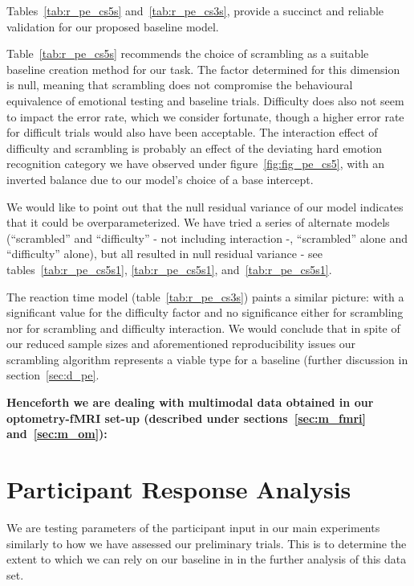 	    Tables~\ref{tab:r_pe_cs5s} and~\ref{tab:r_pe_cs3s}, provide a succinct and reliable validation for our proposed baseline model.
	    
	    Table~\ref{tab:r_pe_cs5s} recommends the choice of scrambling as a suitable baseline creation method for our task.
	    The factor determined for this dimension is null, meaning that scrambling does not compromise the behavioural equivalence of emotional testing and baseline trials.
	    Difficulty does also not seem to impact the error rate, which we consider fortunate, though a higher error rate for difficult trials would also have been acceptable.
	    The interaction effect of difficulty and scrambling is probably an effect of the deviating hard emotion recognition category we have observed under figure~\ref{fig:fig_pe_cs5}, with an inverted balance due to our model's choice of a base intercept.
	    
	    We would like to point out that the null residual variance of our model indicates that it could be overparameterized.
	    We have tried a series of alternate models (“scrambled” and “difficulty” - not including interaction -, “scrambled” alone and “difficulty” alone), but all resulted in null residual variance - 
	    see tables~\ref{tab:r_pe_cs5s1}, \ref{tab:r_pe_cs5s1}, and~\ref{tab:r_pe_cs5s1}.
	    
	    The reaction time model (table~\ref{tab:r_pe_cs3s}) paints a similar picture: with a significant value for the difficulty factor and no significance either for scrambling nor for scrambling and difficulty interaction.
	    We would conclude that in spite of our reduced sample sizes and aforementioned reproducibility issues our scrambling algorithm represents a viable type for a baseline (further discussion in section~\ref{sec:d_pe}.
    \vspace{0.2cm}
    \begin{center}
    \textbf{Henceforth we are dealing with multimodal data obtained in our optometry-fMRI set-up (described under sections~\ref{sec:m_fmri} and~\ref{sec:m_om}):}
    \end{center}
    
    \section{Participant Response Analysis}\label{sec:r_ra}
	We are testing parameters of the participant input in our main experiments similarly to how we have assessed our preliminary trials.
	This is to determine the extent to which we can rely on our baseline in in the further analysis of this data set.

